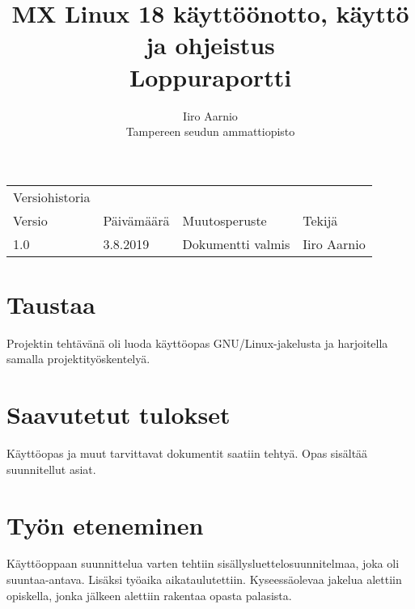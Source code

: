 \documentclass[a4paper, 12pt, finnish]{article}
\title{MX Linux 18 käyttöönotto, käyttö ja ohjeistus \\ \large Loppuraportti} %
\author{Iiro Aarnio \\ Tampereen seudun ammattiopisto \\}
\begin{document}
\maketitle
\thispagestyle{empty} %

\newpage
\thispagestyle{empty}
\begin{table}[htpb]
	\begin{tabular}{llll}
		Versiohistoria &            &                         &             \\
		\rowcolor[HTML]{FFCCC9}
		Versio         & Päivämäärä & Muutosperuste           & Tekijä      \\
		1.0              & 3.8.2019   & Dokumentti valmis       & Iiro Aarnio \\
	\end{tabular}
\end{table}


\newpage
\thispagestyle{empty} %

\tableofcontents

\newpage
{} %

\setcounter{page}{1} %
\newpage
\section{Taustaa}

\begin{adjustwidth}{0.25\textwidth}{}
    Projektin tehtävänä oli luoda käyttöopas GNU/Linux-jakelusta ja harjoitella samalla projektityöskentelyä.
\end{adjustwidth}
\section{Saavutetut tulokset}

\begin{adjustwidth}{0.25\textwidth}{}
    Käyttöopas ja muut tarvittavat dokumentit saatiin tehtyä. Opas sisältää suunnitellut asiat.
\end{adjustwidth}

\section{Työn eteneminen}

\begin{adjustwidth}{0.25\textwidth}{}
    Käyttöoppaan suunnittelua varten tehtiin sisällysluettelosuunnitelmaa, joka oli suuntaa-antava.
    Lisäksi työaika aikataulutettiin. Kyseessäolevaa jakelua alettiin opiskella, jonka jälkeen alettiin rakentaa opasta palasista.

\end{adjustwidth}
\end{document}
